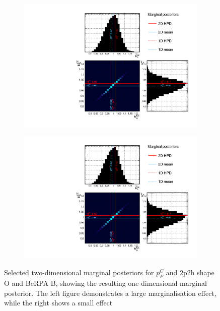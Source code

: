 \begin{figure}[h]
	\begin{subfigure}[t]{0.49\textwidth}
		\includegraphics[width=\textwidth, trim={0mm 0mm 0mm 0mm}, clip,page=15]{figures/mach3/mcmc/2017b_NewDet_3Xsec_4Det_5Flux_NewXSecTune_Asimov_merge_marg_xsec}
	\end{subfigure}
	\begin{subfigure}[t]{0.49\textwidth}
		\includegraphics[width=\textwidth, trim={0mm 0mm 0mm 0mm}, clip,page=23]{figures/mach3/mcmc/2017b_NewDet_3Xsec_4Det_5Flux_NewXSecTune_Asimov_merge_marg_xsec}
	\end{subfigure}
\caption{Selected two-dimensional marginal posteriors for $p_F^C$ and 2p2h shape O and BeRPA B, showing the resulting one-dimensional marginal posterior. The left figure demonstrates a large marginalisation effect, while the right shows a small effect}
\label{fig:marginalisation_pf}
\end{figure}

